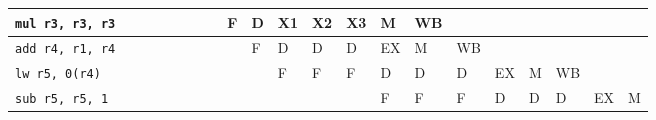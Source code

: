 \documentclass[a4paper,11pt]{article}
\begin{document}
{\begin{landscape}
\begin{table}
\begin{center}
\begin{tabular}{| l | l | l | l | l | l | l | l | l | l | l | l | l | l | l | l | l | l | l | l | l |}
\texttt{mul r3, r3, r3}    &     &     &     &     &     &     &     & F   & D   & X1  & X2  & X3   & M    & WB   &      &      &      &      &      &     \\ \hline
\texttt{add r4, r1, r4}    &     &     &     &     &     &     &     &     & F   & D   &  D  & D    & EX   & M    & WB   &      &      &      &      &     \\ \hline
\texttt{lw r5, 0(r4)}      &     &     &     &     &     &     &     &     &     & F   &  F  & F    & D    & D    & D    & EX   & M    & WB   &      &     \\ \hline
\texttt{sub r5, r5, 1}     &     &     &     &     &     &     &     &     &     &     &     &      & F    & F    & F    & D    & D    & D    & EX   & M   \\ \hline
  \end{tabular}
  \end{center}
  \end{table}
  \end{landscape}
  \clearpage%
}
\end{document}
